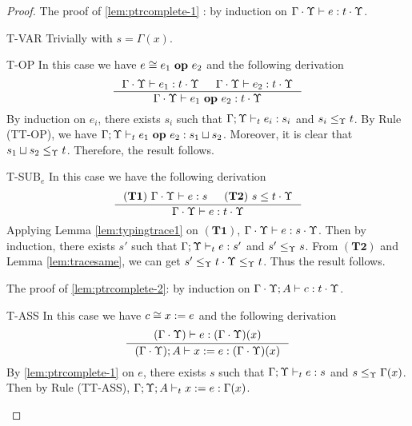 {{{\begin{proof}
The proof of \ref{lem:ptrcomplete-1} : by induction on $\Gamma\cdot\Upsilon \vdash e : t\cdot \Upsilon $.
\begin{ProofEnumDesc}
\item[T-VAR] Trivially with $s = \Gamma(x)$.


\item[T-OP]  In this case we have $e \cong {e_1}~\textbf{op}~{e_2}$ and the following derivation
\begin{equation*}
\inference
{\Gamma\cdot\trace\vdash e_1 : t\cdot\trace & \Gamma\cdot\trace \vdash e_2 : t\cdot\trace}
{\Gamma\cdot\trace\vdash \leOP{e_1}{e_2} : t\cdot\trace}
\end{equation*}
By induction on $e_i$, there exists $s_i$ such that $\Gamma; \Upsilon \vdash_{t} e_i : s_i$ and $s_i \leq_{\Upsilon} t$.
By Rule {(TT-OP)}, we have $\Gamma; \Upsilon\vdash_{t} {e_1}~\textbf{op}~{e_2} : s_1 \sqcup s_2$.
Moreover, it is clear that $s_1 \sqcup s_2 \leq_{\Upsilon} t$. Therefore, the result follows.

\item[T-SUB$_e$] In this case we have the following derivation
\begin{equation*}
\inference
{(\mathbf{T1})~\Gamma\cdot\trace \vdash e : s & (\mathbf{T2})~s \leq t\cdot\trace}
{\Gamma\cdot\trace \vdash e : t\cdot\trace}
\end{equation*}
Applying Lemma \ref{lem:typingtrace1} on $(\mathbf{T1})$, $\Gamma\cdot\Upsilon \vdash e : s\cdot \Upsilon$.
Then by induction, there exists $s'$ such that $\Gamma;\Upsilon \vdash_{t} e : s'$ and $s' \leq_{\Upsilon} s$.
From $(\mathbf{T2})$ and Lemma \ref{lem:tracesame}, we can get $s'\leq_{\Upsilon} t\cdot\Upsilon \leq_{\Upsilon} t $. Thus the result follows.
\end{ProofEnumDesc}

The proof of \ref{lem:ptrcomplete-2}: by induction on $\Gamma\cdot\Upsilon; A \vdash c : t\cdot \Upsilon $. %
\begin{ProofEnumDesc}
\item[T-ASS] In this case we have $c \cong {x}:={e}$ and the following derivation
\begin{equation*}
\inference
{(\Gamma\cdot\trace) \vdash e : (\Gamma\cdot\trace)(x)}
{(\Gamma\cdot\trace);A \vdash \lcASS{x}{e} : (\Gamma\cdot\trace)(x)}
\end{equation*}
By \ref{lem:ptrcomplete-1} on $e$,  there exists $s$ such that
$\Gamma; \Upsilon \vdash_{t} e : s$ and $s \leq_{\Upsilon} \Gamma(x)$.
Then by Rule {(TT-ASS)},  $\Gamma;\Upsilon; A \vdash_{t} {x}:={e} :\Gamma(x)$.


\end{ProofEnumDesc}
\end{proof}}}}
